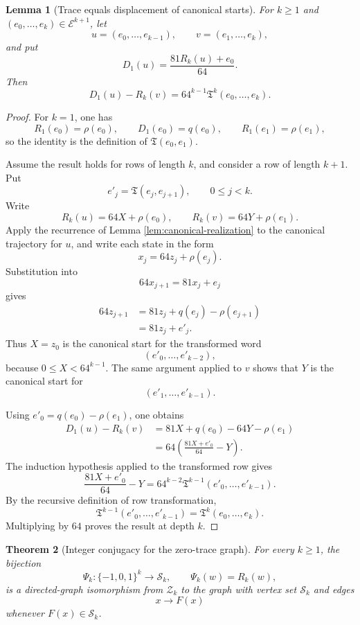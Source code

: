 \documentclass[11pt]{article}
\newtheorem{theorem}{Theorem}[section]
\newtheorem{lemma}[theorem]{Lemma}
\theoremstyle{definition}
\theoremstyle{remark}
\newcommand{\E}{\mathcal{E}}
\newcommand{\Tq}{\mathfrak{T}}
\begin{document}
\begin{lemma}[Trace equals displacement of canonical starts]
\label{lem:trace-displacement}
For $k\ge1$ and $(e_0,\ldots,e_k)\in\E^{k+1}$, let
\[
u=(e_0,\ldots,e_{k-1}),
\qquad
v=(e_1,\ldots,e_k),
\]
and put
\[
D_1(u)=\frac{81R_k(u)+e_0}{64}.
\]
Then
\[
D_1(u)-R_k(v)
=64^{k-1}\Tq^k(e_0,\ldots,e_k).
\]
\end{lemma}

\begin{proof}
For $k=1$, one has
\[
R_1(e_0)=\rho(e_0),
\qquad
D_1(e_0)=q(e_0),
\qquad
R_1(e_1)=\rho(e_1),
\]
so the identity is the definition of $\Tq(e_0,e_1)$.

Assume the result holds for rows of length $k$, and consider a row of length $k+1$. Put
\[
e'_j=\Tq(e_j,e_{j+1}),
\qquad 0\le j<k.
\]
Write
\[
R_k(u)=64X+\rho(e_0),
\qquad
R_k(v)=64Y+\rho(e_1).
\]
Apply the recurrence of Lemma \ref{lem:canonical-realization} to the canonical trajectory for $u$, and write each state in the form
\[
x_j=64z_j+\rho(e_j).
\]
Substitution into
\[
64x_{j+1}=81x_j+e_j
\]
gives
\begin{align*}
64z_{j+1}
&=81z_j+q(e_j)-\rho(e_{j+1})\\
&=81z_j+e'_j.
\end{align*}
Thus $X=z_0$ is the canonical start for the transformed word
\[
(e'_0,\ldots,e'_{k-2}),
\]
because $0\le X<64^{k-1}$. The same argument applied to $v$ shows that $Y$ is the canonical start for
\[
(e'_1,\ldots,e'_{k-1}).
\]

Using $e'_0=q(e_0)-\rho(e_1)$, one obtains
\begin{align*}
D_1(u)-R_k(v)
&=81X+q(e_0)-64Y-\rho(e_1)\\
&=64\left(
\frac{81X+e'_0}{64}-Y
\right).
\end{align*}
The induction hypothesis applied to the transformed row gives
\[
\frac{81X+e'_0}{64}-Y
=64^{k-2}\Tq^{k-1}(e'_0,\ldots,e'_{k-1}).
\]
By the recursive definition of row transformation,
\[
\Tq^{k-1}(e'_0,\ldots,e'_{k-1})
=\Tq^k(e_0,\ldots,e_k).
\]
Multiplying by $64$ proves the result at depth $k$.
\end{proof}

\begin{theorem}[Integer conjugacy for the zero-trace graph]
\label{thm:integer-conjugacy}
For every $k\ge1$, the bijection
\[
\Psi_k:\{-1,0,1\}^k\longrightarrow\mathcal S_k,
\qquad
\Psi_k(w)=R_k(w),
\]
is a directed-graph isomorphism from $\mathcal Z_k$ to the graph with vertex set $\mathcal S_k$ and edges
\[
x\longrightarrow F(x)
\]
whenever $F(x)\in\mathcal S_k$.
\end{theorem}
\end{document}
